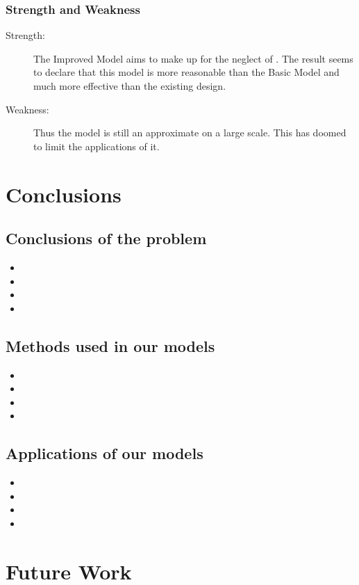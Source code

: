 \documentclass{apmcmthesis}
\begin{document}
\subsubsection{Strength and Weakness}

\begin{description}
\item[Strength:] The Improved Model aims to make up for the neglect of         . The result seems to declare that this model is more reasonable than the Basic Model and much more effective than the existing design.
\item[Weakness:] Thus the model is still an approximate on a large scale. This has doomed to limit the applications of it.
\end{description}

\section{Conclusions}

\subsection{Conclusions of the problem}
\begin{itemize}
\item 	
\item
\item
\item
\end{itemize}	
\subsection{Methods used in our models}
\begin{itemize}
\item 	
\item
\item
\item
\end{itemize}
\subsection{Applications of our models}
\begin{itemize}
\item 	
\item
\item
\item
\end{itemize}
\section{Future Work}
\end{document}
